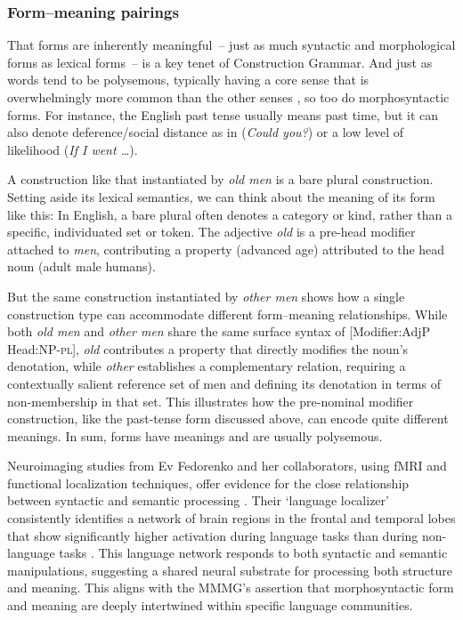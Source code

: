 \subsubsection{Form--meaning pairings}


That forms are inherently meaningful~-- just as much syntactic and morphological forms as lexical forms~-- is a key tenet of Construction Grammar. And just as words tend to be polysemous, typically having a core sense that is overwhelmingly more common  than the other senses \autocite{Kilgarriff2004}, so too do morphosyntactic forms. For instance, the English past tense usually means past time, but it can also denote deference/social distance as in (\textit{Could you?}) or a low level of likelihood (\textit{If I went \dots}).

A construction like that instantiated by \textit{old men} is a bare plural construction. Setting aside its lexical semantics, we can think about the meaning of its form like this: In English, a bare plural often denotes a category or kind, rather than a specific, individuated set or token. The adjective \textit{old} is a pre-head modifier attached to \textit{men}, contributing a property (advanced age) attributed to the head noun (adult male humans).

But the same construction instantiated by \textit{other men} shows how a single construction type can accommodate different form--meaning relationships. While both \textit{old men} and \textit{other men} share the same surface syntax of [Modifier:AdjP Head:NP-\textsc{pl}], \textit{old} contributes a property that directly modifies the noun's denotation, while \textit{other} establishes a complementary relation, requiring a contextually salient reference set of men and defining its denotation in terms of non-membership in that set. This illustrates how the pre-nominal modifier construction, like the past-tense form discussed above, can encode quite different meanings. In sum, forms have meanings and are usually polysemous.

Neuroimaging studies from Ev Fedorenko and her collaborators, using fMRI and functional localization techniques, offer evidence for the close relationship between syntactic and semantic processing \autocite{Fedorenko2011, Fedorenko2012, Fedorenko2024}. Their `language localizer' consistently identifies a network of brain regions in the frontal and temporal lobes that show significantly higher activation during language tasks than during non-language tasks \autocite{Fedorenko2010,}. This language network responds to both syntactic and semantic manipulations, suggesting a shared neural substrate for processing both structure and meaning. This aligns with the MMMG's assertion that morphosyntactic form and meaning are deeply intertwined within specific language communities.

